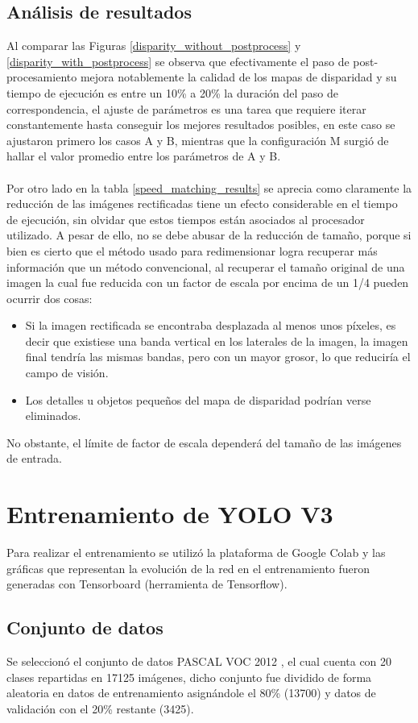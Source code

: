\subsection{Análisis de resultados}
Al comparar las Figuras \ref{disparity_without_postprocess} y \ref{disparity_with_postprocess} se observa que efectivamente el paso de post-procesamiento mejora notablemente la calidad de los mapas de disparidad y su tiempo de ejecución es entre un 10\% a 20\% la duración del paso de correspondencia, el ajuste de parámetros es una tarea que requiere iterar constantemente hasta conseguir los mejores resultados posibles, en este caso se ajustaron primero los casos A y B, mientras que la configuración M surgió de hallar el valor promedio entre los parámetros de A y B. 
\\
\\
Por otro lado en la tabla \ref{speed_matching_results} se aprecia como claramente la reducción de las imágenes rectificadas tiene un efecto considerable en el tiempo de ejecución, sin olvidar que estos tiempos están asociados al procesador utilizado. A pesar de ello, no se debe abusar de la reducción de tamaño, porque si bien es cierto que el método usado para redimensionar logra recuperar más información que un método convencional, al recuperar el tamaño original de una imagen la cual fue reducida con un factor de escala por encima de un 1/4 pueden ocurrir dos cosas:
\begin{itemize}
    \item Si la imagen rectificada se encontraba desplazada al menos unos píxeles, es decir que existiese una banda vertical en los laterales de la imagen, la imagen final tendría las mismas bandas, pero con un mayor grosor, lo que reduciría el campo de visión.
    \item Los detalles u objetos pequeños del mapa de disparidad podrían verse eliminados.
\end{itemize}
No obstante, el límite de factor de escala dependerá del tamaño de las imágenes de entrada.
\section{Entrenamiento de YOLO V3}
Para realizar el entrenamiento se utilizó la plataforma de Google Colab y las gráficas que representan la evolución de la red en el entrenamiento fueron generadas con Tensorboard (herramienta de Tensorflow).
\subsection{Conjunto de datos}
Se seleccionó el conjunto de datos PASCAL VOC 2012 \cite{pascal-voc-2012}, el cual cuenta con 20 clases repartidas en 17125 imágenes, dicho conjunto fue dividido de forma aleatoria en datos de entrenamiento asignándole el 80\% (13700) y datos de validación con el 20\% restante (3425).
